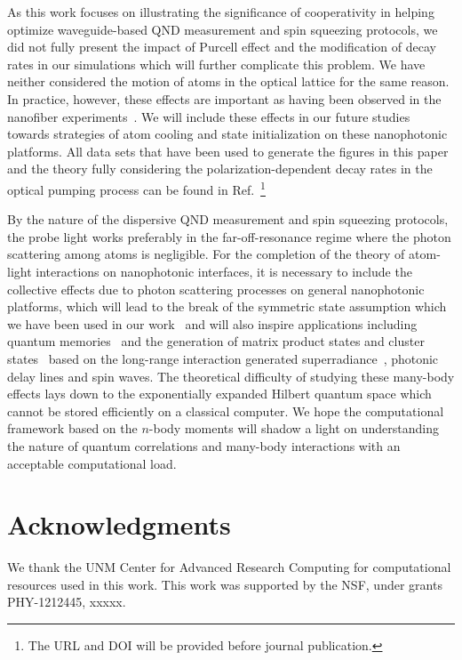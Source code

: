 \documentclass[preprint,aps,pra,onecolumn,superscriptaddress]{revtex4-1} %
\begin{document}
As this work focuses on illustrating the significance of cooperativity in helping optimize waveguide-based QND measurement and spin squeezing protocols, we did not fully present the impact of Purcell effect and the modification of decay rates in our simulations which will further complicate this problem. We have neither considered the motion of atoms in the optical lattice for the same reason. In practice, however, these effects are important as having been observed in the nanofiber experiments~\cite{Solano2017Dynamics,Solano2017Alignment,Beguin2017Observation,Solano2017Optical}. We will include these effects in our future studies towards strategies of atom cooling and state initialization on these nanophotonic platforms. All data sets that have been used to generate the figures in this paper and the theory fully considering the polarization-dependent decay rates in the optical pumping process can be found in Ref.~\footnote{The URL and DOI will be provided before journal publication.} 

By the nature of the dispersive QND measurement and spin squeezing protocols, the probe light works preferably in the far-off-resonance regime where the photon scattering among atoms is negligible. For the completion of the theory of atom-light interactions on nanophotonic interfaces, it is necessary to include the collective effects due to photon scattering processes on general nanophotonic platforms, which will lead to the break of the symmetric state assumption which we have been used in our work~\cite{Qi2016} and will also inspire applications including quantum memories~\cite{Asenjo-Garcia2017Exponential,Asenjo-Garcia2017Atom} and the generation of matrix product states and cluster states~\cite{Economou2010,Lodahl2017Chiral,Schwartz2016Deterministic,Pichler2016Photonic,Pichler2017Photonic} based on the long-range interaction generated superradiance~\cite{Solano2017Super}, photonic delay lines and spin waves. The theoretical difficulty of studying these many-body effects lays down to the exponentially expanded Hilbert quantum space which cannot be stored efficiently on a classical computer. We hope the computational framework based on the $ n $-body moments will shadow a light on understanding the nature of quantum correlations and many-body interactions with an acceptable computational load. 

\section{Acknowledgments}
We thank the UNM Center for Advanced Research Computing for computational resources used in this work.
This work was supported by the NSF, under grants PHY-1212445, xxxxx.
\end{document}
